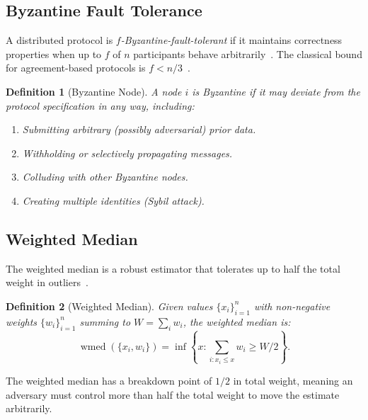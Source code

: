 \documentclass[11pt]{article}
\newtheorem{definition}{Definition}
\DeclareMathOperator{\wmed}{wmed}
\begin{document}
\subsection{Byzantine Fault Tolerance}

A distributed protocol is \emph{$f$-Byzantine-fault-tolerant} if it maintains
correctness properties when up to $f$ of $n$ participants behave
arbitrarily~\cite{lamport1982byzantine}. The classical bound for
agreement-based protocols is $f < n/3$~\cite{pease1980reaching}.

\begin{definition}[Byzantine Node]
A node $i$ is Byzantine if it may deviate from the protocol specification in any
way, including:
\begin{enumerate}[leftmargin=1.5em]
    \item Submitting arbitrary (possibly adversarial) prior data.
    \item Withholding or selectively propagating messages.
    \item Colluding with other Byzantine nodes.
    \item Creating multiple identities (Sybil attack).
\end{enumerate}
\end{definition}

\subsection{Weighted Median}

The weighted median is a robust estimator that tolerates up to half the total
weight in outliers~\cite{minsker2015geometric}.

\begin{definition}[Weighted Median]
Given values $\{x_i\}_{i=1}^n$ with non-negative weights $\{w_i\}_{i=1}^n$
summing to $W = \sum_i w_i$, the weighted median is:
\begin{equation}
    \wmed(\{x_i, w_i\}) = \inf\left\{x : \sum_{i: x_i \leq x} w_i \geq W/2\right\}.
\end{equation}
\end{definition}

The weighted median has a breakdown point of $1/2$ in total weight, meaning an
adversary must control more than half the total weight to move the estimate
arbitrarily.

\end{document}

